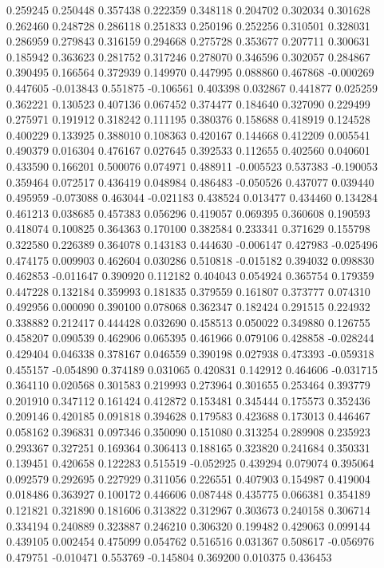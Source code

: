 0.259245
0.250448
0.357438
0.222359
0.348118
0.204702
0.302034
0.301628
0.262460
0.248728
0.286118
0.251833
0.250196
0.252256
0.310501
0.328031
0.286959
0.279843
0.316159
0.294668
0.275728
0.353677
0.207711
0.300631
0.185942
0.363623
0.281752
0.317246
0.278070
0.346596
0.302057
0.284867
0.390495
0.166564
0.372939
0.149970
0.447995
0.088860
0.467868
-0.000269
0.447605
-0.013843
0.551875
-0.106561
0.403398
0.032867
0.441877
0.025259
0.362221
0.130523
0.407136
0.067452
0.374477
0.184640
0.327090
0.229499
0.275971
0.191912
0.318242
0.111195
0.380376
0.158688
0.418919
0.124528
0.400229
0.133925
0.388010
0.108363
0.420167
0.144668
0.412209
0.005541
0.490379
0.016304
0.476167
0.027645
0.392533
0.112655
0.402560
0.040601
0.433590
0.166201
0.500076
0.074971
0.488911
-0.005523
0.537383
-0.190053
0.359464
0.072517
0.436419
0.048984
0.486483
-0.050526
0.437077
0.039440
0.495959
-0.073088
0.463044
-0.021183
0.438524
0.013477
0.434460
0.134284
0.461213
0.038685
0.457383
0.056296
0.419057
0.069395
0.360608
0.190593
0.418074
0.100825
0.364363
0.170100
0.382584
0.233341
0.371629
0.155798
0.322580
0.226389
0.364078
0.143183
0.444630
-0.006147
0.427983
-0.025496
0.474175
0.009903
0.462604
0.030286
0.510818
-0.015182
0.394032
0.098830
0.462853
-0.011647
0.390920
0.112182
0.404043
0.054924
0.365754
0.179359
0.447228
0.132184
0.359993
0.181835
0.379559
0.161807
0.373777
0.074310
0.492956
0.000090
0.390100
0.078068
0.362347
0.182424
0.291515
0.224932
0.338882
0.212417
0.444428
0.032690
0.458513
0.050022
0.349880
0.126755
0.458207
0.090539
0.462906
0.065395
0.461966
0.079106
0.428858
-0.028244
0.429404
0.046338
0.378167
0.046559
0.390198
0.027938
0.473393
-0.059318
0.455157
-0.054890
0.374189
0.031065
0.420831
0.142912
0.464606
-0.031715
0.364110
0.020568
0.301583
0.219993
0.273964
0.301655
0.253464
0.393779
0.201910
0.347112
0.161424
0.412872
0.153481
0.345444
0.175573
0.352436
0.209146
0.420185
0.091818
0.394628
0.179583
0.423688
0.173013
0.446467
0.058162
0.396831
0.097346
0.350090
0.151080
0.313254
0.289908
0.235923
0.293367
0.327251
0.169364
0.306413
0.188165
0.323820
0.241684
0.350331
0.139451
0.420658
0.122283
0.515519
-0.052925
0.439294
0.079074
0.395064
0.092579
0.292695
0.227929
0.311056
0.226551
0.407903
0.154987
0.419004
0.018486
0.363927
0.100172
0.446606
0.087448
0.435775
0.066381
0.354189
0.121821
0.321890
0.181606
0.313822
0.312967
0.303673
0.240158
0.306714
0.334194
0.240889
0.323887
0.246210
0.306320
0.199482
0.429063
0.099144
0.439105
0.002454
0.475099
0.054762
0.516516
0.031367
0.508617
-0.056976
0.479751
-0.010471
0.553769
-0.145804
0.369200
0.010375
0.436453

